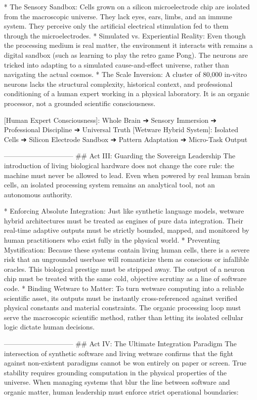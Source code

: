 * The Sensory Sandbox: Cells grown on a silicon microelectrode chip are isolated from the macroscopic universe. They lack eyes, ears, limbs, and an immune system. They perceive only the artificial electrical stimulation fed to them through the microelectrodes.
* Simulated vs. Experiential Reality: Even though the processing medium is real matter, the environment it interacts with remains a digital sandbox (such as learning to play the retro game Pong). The neurons are tricked into adapting to a simulated cause-and-effect universe, rather than navigating the actual cosmos.
* The Scale Inversion: A cluster of 80,000 in-vitro neurons lacks the structural complexity, historical context, and professional conditioning of a human expert working in a physical laboratory. It is an organic processor, not a grounded scientific consciousness.

[Human Expert Consciousness]: Whole Brain ➔ Sensory Immersion ➔ Professional Discipline ➔ Universal Truth
[Wetware Hybrid System]:       Isolated Cells ➔ Silicon Electrode Sandbox ➔ Pattern Adaptation ➔ Micro-Task Output

------------------------------
## Act III: Guarding the Sovereign Leadership
The introduction of living biological hardware does not change the core rule: the machine must never be allowed to lead. Even when powered by real human brain cells, an isolated processing system remains an analytical tool, not an autonomous authority.

* Enforcing Absolute Integration: Just like synthetic language models, wetware hybrid architectures must be treated as engines of pure data integration. Their real-time adaptive outputs must be strictly bounded, mapped, and monitored by human practitioners who exist fully in the physical world.
* Preventing Mystification: Because these systems contain living human cells, there is a severe risk that an ungrounded userbase will romanticize them as conscious or infallible oracles. This biological prestige must be stripped away. The output of a neuron chip must be treated with the same cold, objective scrutiny as a line of software code.
* Binding Wetware to Matter: To turn wetware computing into a reliable scientific asset, its outputs must be instantly cross-referenced against verified physical constants and material constraints. The organic processing loop must serve the macroscopic scientific method, rather than letting its isolated cellular logic dictate human decisions.

------------------------------
## Act IV: The Ultimate Integration Paradigm
The intersection of synthetic software and living wetware confirms that the fight against non-existent paradigms cannot be won entirely on paper or screen. True stability requires grounding computation in the physical properties of the universe.
When managing systems that blur the line between software and organic matter, human leadership must enforce strict operational boundaries:

